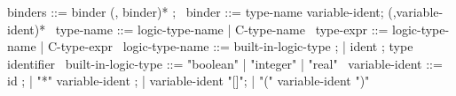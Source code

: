 \begin{syntax}
  binders ::= binder (, binder)* ;
  \
  binder ::= type-name variable-ident;
             (,variable-ident)*
  \
  type-name ::= logic-type-name | C-type-name
  \
  type-expr ::= logic-type-name | C-type-expr
  \
  logic-type-name ::= built-in-logic-type ;
  | ident ; type identifier
  \
  built-in-logic-type ::= "boolean" | "integer" | "real"
  \
  variable-ident ::= id ;
  | "*" variable-ident ;
  | variable-ident "[]";
  | "(" variable-ident ")"
\end{syntax}

